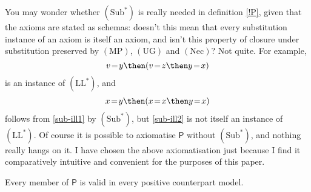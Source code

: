 \documentclass[11pt]{woarticle}
\newcommand{\cmnt}[1]{\iffalse #1 \fi}
\theoremstyle{break}
\theoremstyle{nonumberplain}
\newcommand{\s}[1]{\ensuremath{\mathsf{#1}}}
\newcommand{\1}{\;\,|\;\,}
\newcommand{\T}[1]{\ensuremath{(\mathrm{ #1})}}
\begin{document}
You may wonder whether \T{Sub^*} is really needed in definition \ref{!P}, given
that the axioms are stated as schemas: doesn't this mean that every substitution
instance of an axiom is itself an axiom, and isn't this property of closure
under substitution preserved by \T{MP}, \T{UG} and \T{Nec}? Not quite. For
example,
\begin{equation}\label{sub-ill1}
  v\!=\!y \then (v\!=\!z \then y\!=\!x)
\end{equation}
is an instance of \T{LL^*}, and
\begin{equation}\label{sub-ill2}
  x\!=\!y \then (x\!=\!x \then y\!=\!x)
\end{equation}
follows from \eqref{sub-ill1} by \T{Sub^*}, but \eqref{sub-ill2} is not itself
an instance of \T{LL^*}. Of course it is possible to axiomatise \s{P} without
\T{Sub^*}, and nothing really hangs on it. I have chosen the above
axiomatisation just because I find it comparatively intuitive and convenient for
the purposes of this paper.%
\cmnt{%
  (For example, it frees me from having to prove that \s{P} is a positive logic
  in the sense of definition \ref{!Ps}.)%
} %

\cmnt{
  Closure under first-order substitution may seem redundant for logics
  given by axiom schemas. The condition is still non-empty for
  extensions of the logic, e.g. by a further axiom $Fy$. Moreover, I
  don't think it actually is redundant. E.g. with (Sub), we can infer
  $\vdash x\!=\!y \then Gxx \then Gxy$ from the (LL) instance $\vdash
  v\!=\!y \then Gxv \then Gxy$, but the former isn't itself an (LL)
  instance. In classical logic, (Sub) is given by (UG) and (UI): we
  can go from $\vdash A$ to $\forall x A$ to $[y/x]A$. However, in
  free logics, the last step is restricted to existing $y$.

  The restriction that $y$ is m.f. in $A$ is there to prevent e.g. the
  move from $\vdash v\!=\!y \then \Box x\!=\!v \then \Box x\!=\!y$ to
  $\vdash x\!=\!y \then \Box x\!=\!x \then \Box x\!=\!y$.
  
  We don't have closure under second-order substitution. E.g. negative
  free logic is not closed under substitution of complex formulas for
  atomic predicates because $Fx \then Ex$ is valid, but $\neg Fx \then
  Ex$ is not.
} 



\begin{theorem}[Soundness of \s{P}]\label{soundness-P}
  Every member of \s{P} is valid in every positive counterpart model.
\end{theorem}
\end{document}
